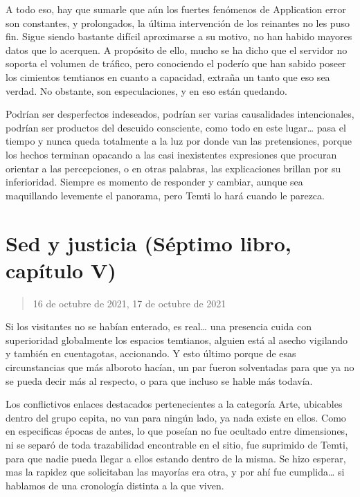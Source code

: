 \documentclass[
  spanish,
]{book}
\begin{document}
A todo eso, hay que sumarle que aún los fuertes fenómenos de Application error son constantes, y prolongados, la última intervención de los reinantes no les puso fin. Sigue siendo bastante difícil aproximarse a su motivo, no han habido mayores datos que lo acerquen. A propósito de ello, mucho se ha dicho que el servidor no soporta el volumen de tráfico, pero conociendo el poderío que han sabido poseer los cimientos temtianos en cuanto a capacidad, extraña un tanto que eso sea verdad. No obstante, son especulaciones, y en eso están quedando.

Podrían ser desperfectos indeseados, podrían ser varias causalidades intencionales, podrían ser productos del descuido consciente, como todo en este lugar\ldots{} pasa el tiempo y nunca queda totalmente a la luz por donde van las pretensiones, porque los hechos terminan opacando a las casi inexistentes expresiones que procuran orientar a las percepciones, o en otras palabras, las explicaciones brillan por su inferioridad. Siempre es momento de responder y cambiar, aunque sea maquillando levemente el panorama, pero Temti lo hará cuando le parezca.

\hypertarget{sed-y-justicia-suxe9ptimo-libro-capuxedtulo-v}{%
\section{Sed y justicia (Séptimo libro, capítulo V)}\label{sed-y-justicia-suxe9ptimo-libro-capuxedtulo-v}}

\begin{quote}
16 de octubre de 2021, 17 de octubre de 2021
\end{quote}

Si los visitantes no se habían enterado, es real\ldots{} una presencia cuida con superioridad globalmente los espacios temtianos, alguien está al asecho vigilando y también en cuentagotas, accionando. Y esto último porque de esas circunstancias que más alboroto hacían, un par fueron solventadas para que ya no se pueda decir más al respecto, o para que incluso se hable más todavía.

Los conflictivos enlaces destacados pertenecientes a la categoría Arte, ubicables dentro del grupo cepita, no van para ningún lado, ya nada existe en ellos. Como en especificas épocas de antes, lo que poseían no fue ocultado entre dimensiones, ni se separó de toda trazabilidad encontrable en el sitio, fue suprimido de Temti, para que nadie pueda llegar a ellos estando dentro de la misma. Se hizo esperar, mas la rapidez que solicitaban las mayorías era otra, y por ahí fue cumplida\ldots{} si hablamos de una cronología distinta a la que viven.
\end{document}
